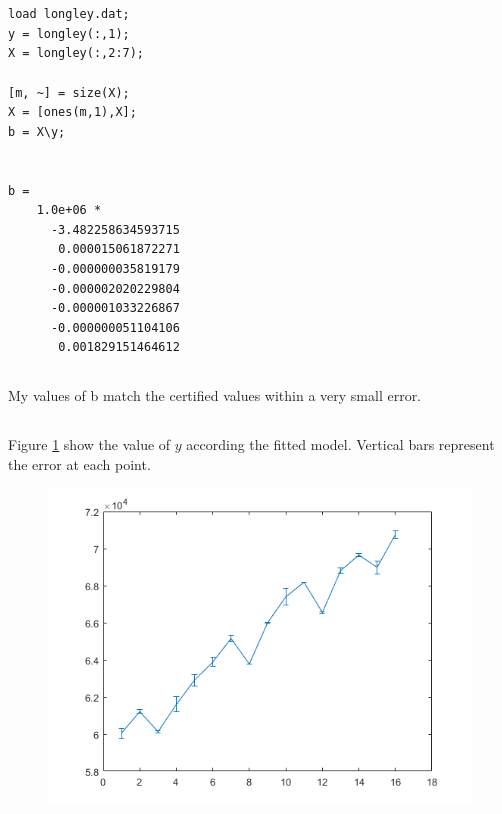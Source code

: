 \documentclass[12pt]{article}
\begin{document}
\section{} %

\subsection{} %
\begin{minipage}{\linewidth}
\begin{lstlisting}
load longley.dat;
y = longley(:,1);
X = longley(:,2:7);

[m, ~] = size(X);
X = [ones(m,1),X];
b = X\y;


b =    
    1.0e+06 *
      -3.482258634593715
       0.000015061872271
      -0.000000035819179
      -0.000002020229804
      -0.000001033226867
      -0.000000051104106
       0.001829151464612
\end{lstlisting}
\end{minipage}

\subsection{} %

My values of b match the certified values within a very small error.

\subsection{} %

Figure \ref{fig_4c} show the value of $y$ according the fitted model. Vertical bars represent the error at each point.

\begin{figure}
    \includegraphics[width=0.6\linewidth]{plot_4c}
    \centering
    \caption{}
    \label{fig_4c}
\end{figure}
\end{document}
